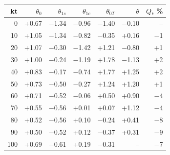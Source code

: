 \begin{tabular}{@{}rrrrrrr@{}}
\toprule
kt & $\theta_0$ & $\theta_{1s}$ & $\theta_{1c}$ & $\theta_{0T}$ & $\theta$ & $Q$, \% \\
\midrule
0 & +0.67 & $-$1.34 & $-$0.96 & $-$1.40 & $-$0.10 & -- \\
10 & +1.05 & $-$1.34 & $-$0.82 & $-$0.35 & +0.16 & $-$1 \\
20 & +1.07 & $-$0.30 & $-$1.42 & +1.21 & $-$0.80 & +1 \\
30 & +1.00 & $-$0.24 & $-$1.19 & +1.78 & $-$1.13 & +2 \\
40 & +0.83 & $-$0.17 & $-$0.74 & +1.77 & +1.25 & +2 \\
50 & +0.73 & $-$0.50 & $-$0.27 & +1.24 & +1.20 & +1 \\
60 & +0.71 & $-$0.52 & $-$0.06 & +0.50 & +0.90 & $-$4 \\
70 & +0.55 & $-$0.56 & +0.01 & +0.07 & +1.12 & $-$4 \\
80 & +0.52 & $-$0.56 & +0.10 & $-$0.24 & +0.41 & $-$8 \\
90 & +0.50 & $-$0.52 & +0.12 & $-$0.37 & +0.31 & $-$9 \\
100 & +0.69 & $-$0.61 & +0.19 & $-$0.31 & -- & $-$7 \\
\bottomrule
\end{tabular}
